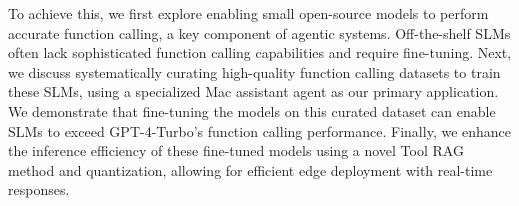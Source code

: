  
To achieve this, we first explore enabling small open-source models to perform accurate function calling, a key component of agentic systems. 
Off-the-shelf SLMs often lack sophisticated function calling capabilities and require fine-tuning.
Next, we discuss systematically curating high-quality function calling datasets to train these SLMs, using a specialized Mac assistant agent as our primary application. 
We demonstrate that fine-tuning the models on this curated dataset can enable SLMs to exceed GPT-4-Turbo’s function calling performance. 
Finally, we enhance the inference efficiency of these fine-tuned models using a novel Tool RAG method and quantization, allowing for efficient edge deployment with real-time responses.




